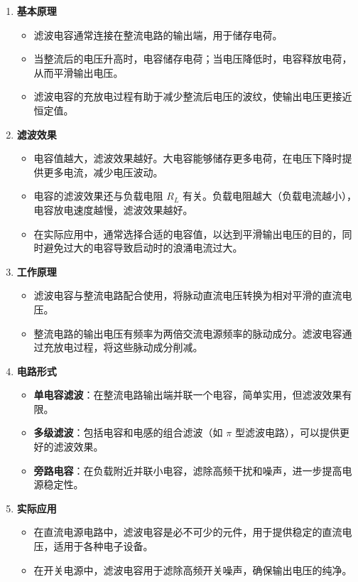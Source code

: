 \documentclass[dvipsnames, svgnames,a4paper,11pt]{article}
\begin{document}
		\begin{enumerate}
			\item \textbf{基本原理}
				\begin{itemize}
					\item 滤波电容通常连接在整流电路的输出端，用于储存电荷。
					\item 当整流后的电压升高时，电容储存电荷；当电压降低时，电容释放电荷，从而平滑输出电压。
					\item 滤波电容的充放电过程有助于减少整流后电压的波纹，使输出电压更接近恒定值。
				\end{itemize}
			
			\item \textbf{滤波效果}
				\begin{itemize}
					\item 电容值越大，滤波效果越好。大电容能够储存更多电荷，在电压下降时提供更多电流，减少电压波动。
					\item 电容的滤波效果还与负载电阻 \( R_L \) 有关。负载电阻越大（负载电流越小），电容放电速度越慢，滤波效果越好。
					\item 在实际应用中，通常选择合适的电容值，以达到平滑输出电压的目的，同时避免过大的电容导致启动时的浪涌电流过大。
				\end{itemize}
			
			\item \textbf{工作原理}
				\begin{itemize}
					\item 滤波电容与整流电路配合使用，将脉动直流电压转换为相对平滑的直流电压。
					\item 整流电路的输出电压有频率为两倍交流电源频率的脉动成分。滤波电容通过充放电过程，将这些脉动成分削减。
				\end{itemize}
			
			\item \textbf{电路形式}
				\begin{itemize}
					\item \textbf{单电容滤波}：在整流电路输出端并联一个电容，简单实用，但滤波效果有限。
					\item \textbf{多级滤波}：包括电容和电感的组合滤波（如 \( \pi \) 型滤波电路），可以提供更好的滤波效果。
					\item \textbf{旁路电容}：在负载附近并联小电容，滤除高频干扰和噪声，进一步提高电源稳定性。
				\end{itemize}
			
			\item \textbf{实际应用}
				\begin{itemize}
					\item 在直流电源电路中，滤波电容是必不可少的元件，用于提供稳定的直流电压，适用于各种电子设备。
					\item 在开关电源中，滤波电容用于滤除高频开关噪声，确保输出电压的纯净。
				\end{itemize}
			

\end{enumerate}
\end{document}
